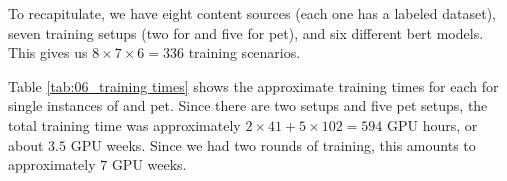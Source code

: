 \label{06_methodology_summary}


To recapitulate, we have eight content sources (each one has a labeled dataset), seven training setups (two for \finetuning{} and five for \gls{pet}), and six different \gls{bert} models. This gives us $8\times 7 \times 6 = 336$ training scenarios.



Table \ref{tab:06_training times} shows the approximate training times for each \contentType{} for single instances of \finetuning{} and \gls{pet}. Since there are two \finetuning{} setups and five \gls{pet} setups, the total training time was approximately $2\times 41 + 5 \times 102 = 594 $ GPU hours, or about $3.5$ GPU weeks.
Since we had two rounds of training, this amounts to approximately $7$ GPU weeks.
